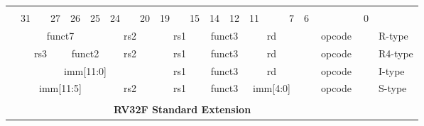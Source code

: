 \begin{table}[p]
\begin{small}
\begin{center}
    \begin{tabular} {p{0.002in}p{0.002in}p{0.002in}p{0.002in}p{0.002in}p{0.002in}p{0.002in}p{0.002in}p{0.002in}p{0.002in}p{0.002in}p{0.002in}p{0.002in}p{0.002in}p{0.002in}p{0.002in}p{0.002in}p{0.002in}p{0.002in}p{0.002in}p{0.002in}p{0.002in}p{0.002in}p{0.002in}p{0.002in}p{0.002in}p{0.002in}p{0.002in}p{0.002in}p{0.002in}p{0.002in}p{0.002in}p{0.002in}l}
    & & & & & & & & & & & & & & & & & & & & & & & & & & & & & & & & \\

            &

    \multicolumn{3}{l}{31} &
    \multicolumn{2}{r}{27} &
    \multicolumn{1}{c}{26} &
    \multicolumn{1}{r}{25} &
    \multicolumn{3}{l}{24} &
    \multicolumn{2}{r}{20} &
    \multicolumn{3}{l}{19} &
    \multicolumn{2}{r}{15} &
    \multicolumn{2}{l}{14} &
    \multicolumn{1}{r}{12} &
    \multicolumn{4}{l}{11} &
    \multicolumn{1}{r}{7} &
    \multicolumn{6}{l}{6} &
    \multicolumn{1}{r}{0} \\
    \cline{2-33}
&


\multicolumn{7}{|c|}{funct7} &
\multicolumn{5}{c|}{rs2} &
\multicolumn{5}{c|}{rs1} &
\multicolumn{3}{c|}{funct3} &
\multicolumn{5}{c|}{rd} &
\multicolumn{7}{|c|}{opcode} & R-type \\
\cline{2-33}
&

\multicolumn{5}{|c|}{rs3} &
\multicolumn{2}{c|}{funct2} &
\multicolumn{5}{c|}{rs2} &
\multicolumn{5}{c|}{rs1} &
\multicolumn{3}{c|}{funct3} &
\multicolumn{5}{c|}{rd} &
\multicolumn{7}{|c|}{opcode} & R4-type \\
\cline{2-33}
&

\multicolumn{12}{|c|}{imm[11:0]} &
\multicolumn{5}{c|}{rs1} &
\multicolumn{3}{c|}{funct3} &
\multicolumn{5}{c|}{rd} &
\multicolumn{7}{|c|}{opcode} & I-type \\
\cline{2-33}
&

\multicolumn{7}{|c|}{imm[11:5]} &
\multicolumn{5}{c|}{rs2} &
\multicolumn{5}{c|}{rs1} &
\multicolumn{3}{c|}{funct3} &
\multicolumn{5}{c|}{imm[4:0]} &
\multicolumn{7}{|c|}{opcode} & S-type \\
\cline{2-33}
&




\multicolumn{32}{c}{} & \\
\multicolumn{32}{c}{\bf RV32F Standard Extension } & \\
\cline{2-33}


\end{tabular}
\end{center}
\end{small}
\end{table}
